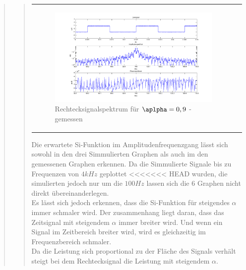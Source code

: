 \begin{quote}
\begin{quote}
\begin{center}
\begin{tabular}{ll}
\begin{minipage}{0.6\textwidth}
                    \begin{figure}[H]
                        \label{fig:}            
                        \includegraphics[scale=0.3]{./Bilder/recht_alpha9_-_gemessen.png} %
                        \caption{Rechtecksignalspektrum für $\aplpha = 0,9$ - gemessen}
                    \end{figure}                
                
                \end{minipage}
                        
            \end{tabular}
            \end{center}
            
            Die erwartete Si-Funktion im Amplitudenfrequenzgang lässt sich sowohl in den drei Simmulierten Graphen als
            auch im den gemessenen Graphen erkennen. Da die Simmulierte Signale bis zu Frequenzen von $4 kHz$ geplottet
<<<<<<< HEAD
            wurden, die simulierten jedoch nur um die $100 Hz$ lassen sich die 6 Graphen nicht direkt
            übereinanderlegen.\\
            Es lässt sich jedoch erkennen, dass die Si-Funktion für steigendes $\alpha$ immer schmaler wird. Der
            zusammenhang liegt daran, dass das Zeitsignal mit steigendem $\alpha$ immer breiter wird. Und wenn ein
            Signal im Zeitbereich breiter wird, wird es gleichzeitig im Frequenzbereich schmaler.\\
            
            Da die Leistung sich proportional zu der Fläche des Signals verhält steigt bei dem Rechtecksignal die
            Leistung mit steigendem $\alpha$.
                     

\end{quote}
\end{quote}
